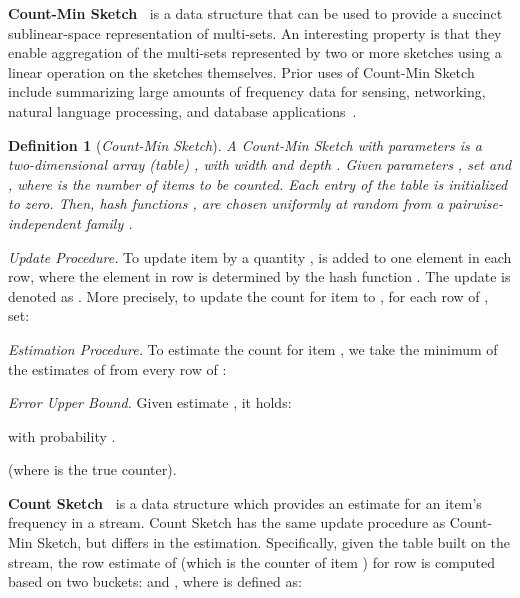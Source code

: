 \documentclass[conference]{IEEEtran}
\newcommand{\descr}[1]{\medskip \noindent \textbf{#1}}
\newcommand{\descrit}[1]{\smallskip \noindent \emph{#1}}
\newtheorem{definition}{Definition}
\begin{document}
\descr{Count-Min Sketch~\cite{cormode2005improved}} is a data structure that can be used to provide a succinct sublinear-space representation of multi-sets. An interesting property is that they enable aggregation of the multi-sets represented by two or more sketches using a linear operation on the sketches themselves. Prior uses of Count-Min Sketch include summarizing large amounts of frequency data for sensing, networking, natural language processing, and database applications~\cite{site}.


\vspace*{0.1cm}
\begin{definition}[\itshape  Count-Min Sketch]\label{def:count} 
A Count-Min Sketch with parameters  is a two-dimensional array (table) , with width  and depth . 
Given parameters , set  and , where  is the number of items to be counted. Each entry of the table is initialized to zero. Then,  hash functions
, are chosen uniformly at random from a pairwise-independent family .\vspace*{-0.15cm}
\end{definition}

\descrit{Update Procedure.} To update item  by a quantity ,  is added to one element in each row, where the element in row  is determined by the hash function . The update is
denoted as .
More precisely, to update the count for item  to , for each row  of , set: \vspace{-0.1cm} 



\descrit{Estimation Procedure.}
To estimate the count  for item , we take the minimum of the estimates of  from every row of :\vspace{-0.1cm} 



\descrit{Error Upper Bound.} Given estimate , it holds: \begin{compactenum}
\item 
\item   with probability .
\end{compactenum}
(where  is the true counter).




\descr{Count Sketch~\cite{charikar2002finding}} is a data structure which provides an estimate for an item's frequency in a stream. Count Sketch has the same update procedure as Count-Min Sketch, but differs in the estimation.
Specifically, given the table  built on the stream, the row estimate of  (which is the counter of item ) for row  is computed based on two buckets:  and , where  is defined as: \vspace{-0.15cm}
\end{document}
